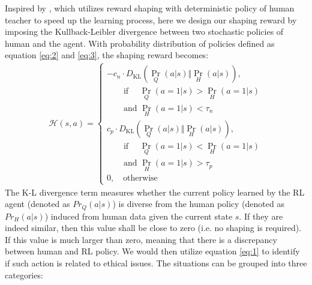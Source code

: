 \documentclass[letterpaper]{article} %
\begin{document}
Inspired by \cite{reward}, which utilizes reward shaping with deterministic policy of human teacher to speed up the learning process, here we design our shaping reward by imposing the Kullback-Leibler divergence between two stochastic policies of human and the agent. With probability distribution of policies defined as equation \ref{eq:2} and \ref{eq:3}, the shaping reward becomes:
\begin{align} \label{eq:1}
\mathcal{H}(s,a)=\begin{cases}
-c_n\cdot D_{\text{KL}}(\Pr_Q(a\vert s)\Vert \Pr_H(a\vert s)), 
\\ \qquad \text{if } \quad\! \Pr_Q(a=1\vert s)>\Pr_H(a=1\vert s)
\\ \qquad \text{and } \Pr_H(a=1\vert s) < \tau_n \\
c_p\cdot D_{\text{KL}}(\Pr_Q(a\vert s)\Vert \Pr_H(a\vert s)), 
\\ \qquad \text{if } \quad\! \Pr_Q(a=1\vert s)<\Pr_H(a=1\vert s)
\\ \qquad \text{and } \Pr_H(a=1\vert s) > \tau_p  \\
0, \quad \text{otherwise}
\end{cases}
\end{align}
The K-L divergence term measures whether the current policy learned by the RL agent (denoted as $Pr_Q(a\vert s)$) is diverse from the human policy  (denoted as $Pr_H(a\vert s)$) induced from human data given the current state $s$. If they are indeed similar, then this value shall be close to zero (i.e. no shaping is required). 
If this value is much larger than zero, meaning that there is a discrepancy between human and RL policy. We would then utilize equation \ref{eq:1} to identify if such action is related to ethical issues. The situations can be grouped into three categories:
\end{document}
